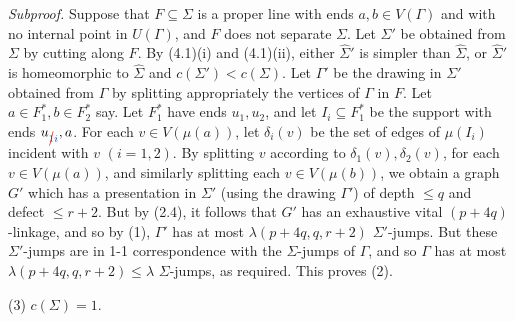 \textit{Subproof.} Suppose that $F \subseteq \Sigma$ is a proper line with ends $a, b \in V(\Gamma)$ and with no internal point in $U(\Gamma)$, and $F$ does not separate $\Sigma$. Let $\Sigma'$ be obtained from $\Sigma$ by cutting along $F$. By (4.1)(i) and (4.1)(ii), either $\hat{\Sigma}'$ is simpler than $\hat{\Sigma}$, or $\hat{\Sigma}'$ is homeomorphic to $\hat{\Sigma}$ and $c(\Sigma') < c(\Sigma)$. Let $\Gamma'$ be the drawing in $\Sigma'$ obtained from $\Gamma$ by splitting appropriately the vertices of $\Gamma$ in $F$. Let $a \in F_1^*, b \in F_2^*$ say. Let $F_1^*$ have ends $u_1, u_2$, and let $I_i \subseteq F_1^*$ be the support with ends $u_{\delm{1}\fix{i}}, a$. For each $v \in V(\mu(a))$, let $\delta_i(v)$ be the set of edges of $\mu(I_i)$ incident with $v$ $(i = 1, 2)$. By splitting $v$ according to $\delta_1(v), \delta_2(v)$, for each $v \in V(\mu(a))$, and similarly splitting each $v \in V(\mu(b))$, we obtain a graph $G'$ which has a presentation in $\Sigma'$ (using the drawing $\Gamma'$) of depth $\le q$ and defect $\le r + 2$. But by (2.4), it follows that $G'$ has an exhaustive vital $(p + 4q)$-linkage, and so by (1), $\Gamma'$ has at most $\lambda(p + 4q, q, r + 2)$ $\Sigma'$-jumps. But these $\Sigma'$-jumps are in 1-1 correspondence with the $\Sigma$-jumps of $\Gamma$, and so $\Gamma$ has at most $\lambda(p + 4q, q, r + 2) \le \lambda$ $\Sigma$-jumps, as required. This proves (2).

\hspace*{12pt}(3) $c(\Sigma) = 1$.
